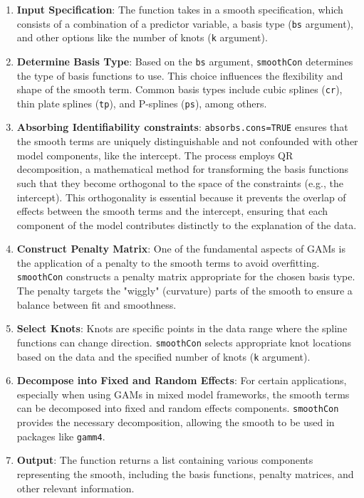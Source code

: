 \documentclass[12pt, twoside,hidelinks]{article}
\theoremstyle{definition}
\numberwithin{equation}{section}
\begin{document}
\begin{enumerate}[label=\arabic*., left=0pt]
    \item \textbf{Input Specification}: The function takes in a smooth specification, which consists of a combination of a predictor variable, a basis type (\texttt{bs} argument), and other options like the number of knots (\texttt{k} argument).
    
    \item \textbf{Determine Basis Type}: Based on the \texttt{bs} argument, \texttt{smoothCon} determines the type of basis functions to use. This choice influences the flexibility and shape of the smooth term. Common basis types include cubic splines (\texttt{cr}), thin plate splines (\texttt{tp}), and P-splines (\texttt{ps}), among others.

    \item \textbf{Absorbing Identifiability constraints}: \texttt{absorbs.cons=TRUE} ensures that the smooth terms are uniquely distinguishable and not confounded with other model components, like the intercept. The process employs QR decomposition, a mathematical method for transforming the basis functions such that they become orthogonal to the space of the constraints (e.g., the intercept). This orthogonality is essential because it prevents the overlap of effects between the smooth terms and the intercept, ensuring that each component of the model contributes distinctly to the explanation of the data. 

    
    \item \textbf{Construct Penalty Matrix}: One of the fundamental aspects of GAMs is the application of a penalty to the smooth terms to avoid overfitting. \texttt{smoothCon} constructs a penalty matrix appropriate for the chosen basis type. The penalty targets the "wiggly" (curvature) parts of the smooth to ensure a balance between fit and smoothness.
    
    \item \textbf{Select Knots}: Knots are specific points in the data range where the spline functions can change direction. \texttt{smoothCon} selects appropriate knot locations based on the data and the specified number of knots (\texttt{k} argument).
    
    \item \textbf{Decompose into Fixed and Random Effects}: For certain applications, especially when using GAMs in mixed model frameworks, the smooth terms can be decomposed into fixed and random effects components. \texttt{smoothCon} provides the necessary decomposition, allowing the smooth to be used in packages like \texttt{gamm4}.
    
    \item \textbf{Output}: The function returns a list containing various components representing the smooth, including the basis functions, penalty matrices, and other relevant information.
\end{enumerate}
\end{document}
